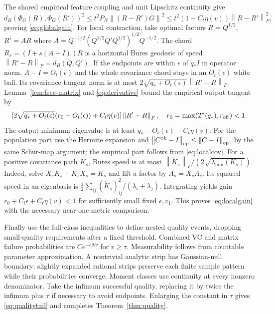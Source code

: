 \documentclass[11pt]{article}
\newcommand{\norm}[1]{\left\lVert#1\right\rVert}
\begin{document}
The shared empirical feature coupling and unit Lipschitz continuity give
\[
 d_B(\Phi_G(R),\Phi_G(R'))^2\le t^2P_N\norm{(R-R')G}^2
 \le t^2(1+C_t\eta(v))\norm{R-R'}_F^2,
\]
proving \eqref{eq:globalgain}. For local contraction, take optimal factors $R=Q^{1/2}$, $R'=AR$ where
$A=Q^{-1/2}(Q^{1/2}Q'Q^{1/2})^{1/2}Q^{-1/2}$. The chord $R_s=(I+s(A-I))R$ is a horizontal Bures geodesic of speed $\norm{R'-R}_F=d_B(Q,Q')$. If the endpoints are within $\epsilon$ of $q_*I$ in operator norm, $A-I=O_t(\epsilon)$ and the whole covariance chord stays in an $O_t(\epsilon)$ white ball. Its covariance tangent norm is at most $2\sqrt{q_*+O_t(\epsilon)}\norm{R'-R}_F$.
Lemma~\ref{lem:free-matrix} and \eqref{eq:derivative} bound the empirical output tangent by
\[
 [2\sqrt{q_*+O_t(\epsilon)}(r_0+O_t(\epsilon))+C_t\eta(v)]\norm{R'-R}_F,
 \quad r_0=\max(T'(q_*),r_{\rm off})<1.
\]
The output minimum eigenvalue is at least $q_*-O_t(\epsilon)-C_t\eta(v)$. For the population part use the Hermite expansion and $\norm{C^{\circ k}-I}_{\op}\le\norm{C-I}_{\op}$, by the same Schur-map argument; the empirical part follows from \eqref{eq:localcov}.
For a positive covariance path $K_s$, Bures speed is at most $\norm{\dot K_s}_F/(2\sqrt{\lambda_{\min}(K_s)})$. Indeed, solve $X_sK_s+K_sX_s=\dot K_s$ and lift a factor by $\dot A_s=X_sA_s$. Its squared speed in an eigenbasis is $\frac12\sum_{ij}(\dot K_s)_{ij}^2/(\lambda_i+\lambda_j)$. Integrating yields gain $r_0+C_t\epsilon+C_t\eta(v)<1$ for sufficiently small fixed $\epsilon,v_1$. This proves \eqref{eq:localgain} with the necessary near-one metric comparison.

Finally use the full-class inequalities to define nested quality events, dropping small-quality requirements after a fixed threshold. Combined VC and matrix failure probabilities are $Ce^{-cNv}$ for $v\ge\tau$. Measurability follows from countable parameter approximation. A nontrivial analytic strip has Gaussian-null boundary; slightly expanded rational strips preserve each finite sample pattern while their probabilities converge. Moment classes use continuity at every nonzero denominator. Take the infimum successful quality, replacing it by twice the infimum plus $\tau$ if necessary to avoid endpoints. Enlarging the constant in $\tau$ gives \eqref{eq:qualitytail} and completes Theorem~\ref{thm:quality}.
\end{document}

